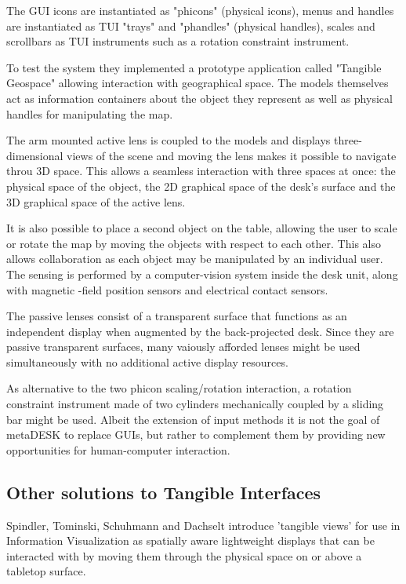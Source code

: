 The GUI icons are instantiated as "phicons" (physical icons), menus and handles are instantiated as TUI "trays" and "phandles" (physical handles), scales and scrollbars as TUI instruments such as a rotation constraint instrument. 

To test the system they implemented a prototype application called "Tangible Geospace" allowing interaction with geographical space.
The models themselves act as information containers about the object they represent as well as physical handles for manipulating the map.

The arm mounted active lens is coupled to the models and displays three-dimensional views of the scene and moving the lens makes it possible to navigate throu 3D space. This allows a seamless interaction with three spaces at once: the physical space of the object, the 2D graphical space of the desk's surface and the 3D graphical space of the active lens.

It is also possible to place a second object on the table, allowing the user to scale or rotate the map by moving the objects with respect to each other. This also allows collaboration as each object may be manipulated by an individual user. The sensing is performed by a computer-vision system inside the desk unit, along with magnetic -field position sensors and electrical contact sensors.

The passive lenses consist of a transparent surface that functions as an independent display when augmented by the back-projected desk. Since they are passive transparent surfaces, many vaiously afforded lenses might be used simultaneously with no additional active display resources.

As alternative to the two phicon scaling/rotation interaction, a rotation constraint instrument made of two cylinders mechanically coupled by a sliding bar might be used.
Albeit the extension of input methods it is not the goal of metaDESK to replace GUIs, but rather to complement them by providing new opportunities for human-computer interaction. 



\subsection{Other solutions to Tangible Interfaces}
Spindler, Tominski, Schuhmann and Dachselt \cite{spindler10} introduce 'tangible views' for use in Information Visualization as spatially aware lightweight displays that can be interacted with by moving them through the physical space on or above a tabletop surface. 

